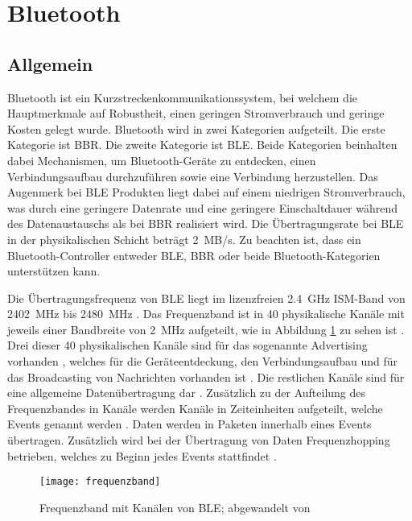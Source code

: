 \section{Bluetooth}

\subsection{Allgemein}

Bluetooth ist ein Kurzstreckenkommunikationssystem, bei welchem die Hauptmerkmale auf Robustheit, einen geringen Stromverbrauch und geringe Kosten gelegt wurde. Bluetooth wird in zwei Kategorien aufgeteilt. Die erste Kategorie ist \ac{BBR}. Die zweite Kategorie ist \ac{BLE}. Beide Kategorien beinhalten dabei Mechanismen, um Bluetooth-Geräte zu entdecken, einen Verbindungsaufbau durchzuführen sowie eine Verbindung herzustellen. Das Augenmerk bei \ac{BLE} Produkten liegt dabei auf einem niedrigen Stromverbrauch, was durch eine geringere Datenrate und eine geringere Einschaltdauer während des Datenaustauschs als bei \ac{BBR} realisiert wird. Die Übertragungsrate bei \ac{BLE} in der physikalischen Schicht beträgt 2~MB/s. Zu beachten ist, dass ein Bluetooth-Controller entweder \ac{BLE}, \ac{BBR} oder beide Bluetooth-Kategorien unterstützen kann. \cite[S.~187]{bluetoothCore}

Die Übertragungsfrequenz von \ac{BLE} liegt im lizenzfreien 2.4~GHz \acf{ISM}-Band von 2402~MHz bis 2480~MHz \cites[S.~4]{siliconBLE}[S.~190]{bluetoothCore}. Das Frequenzband ist in 40 physikalische Kanäle mit jeweils einer Bandbreite von 2~MHz aufgeteilt, wie in Abbildung \ref{fig:frequenzbandBLE} zu sehen ist \cite[S.~190]{bluetoothCore}. Drei dieser 40 physikalischen Kanäle sind für das sogenannte Advertising vorhanden \cite[S.~190]{bluetoothCore}, welches für die Geräteentdeckung, den Verbindungsaufbau und für das Broadcasting von Nachrichten vorhanden ist \cite[S.~4]{siliconBLE}. Die restlichen Kanäle sind für eine allgemeine Datenübertragung dar \cite[S.~190]{bluetoothCore}. Zusätzlich zu der Aufteilung des Frequenzbandes in Kanäle werden Kanäle in Zeiteinheiten aufgeteilt, welche Events genannt werden \cite[S.~190]{bluetoothCore}. Daten werden in Paketen innerhalb eines Events übertragen. Zusätzlich wird bei der Übertragung von Daten Frequenzhopping betrieben, welches zu Beginn jedes Events stattfindet \cite[S.~190f.]{bluetoothCore}. 

\begin{figure}[H]
\centering
\texttt{[image: frequenzband]}
\caption{Frequenzband mit Kanälen von \ac{BLE}; abgewandelt von \cite[S.~4]{siliconBLE}}
\label{fig:frequenzbandBLE}
\end{figure}

